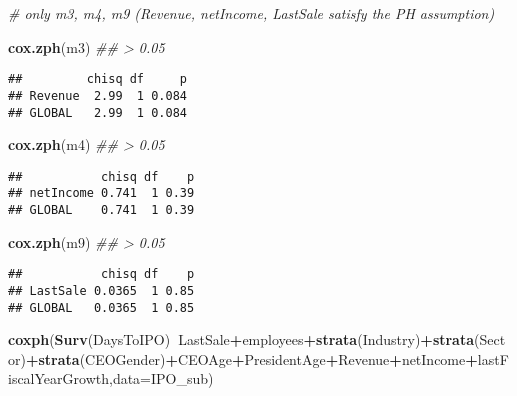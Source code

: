 \documentclass[]{article}
\newenvironment{Shaded}{\begin{snugshade}}{\end{snugshade}}
\newcommand{\CommentTok}[1]{\textcolor[rgb]{0.56,0.35,0.01}{\textit{#1}}}
\newcommand{\DataTypeTok}[1]{\textcolor[rgb]{0.13,0.29,0.53}{#1}}
\newcommand{\KeywordTok}[1]{\textcolor[rgb]{0.13,0.29,0.53}{\textbf{#1}}}
\newcommand{\NormalTok}[1]{#1}
\newcommand{\OperatorTok}[1]{\textcolor[rgb]{0.81,0.36,0.00}{\textbf{#1}}}
\begin{document}
\begin{Shaded}
\begin{Highlighting}[]
\CommentTok{# only m3, m4, m9 (Revenue, netIncome, LastSale satisfy the PH assumption)}

\KeywordTok{cox.zph}\NormalTok{(m3) }\CommentTok{## >  0.05}
\end{Highlighting}
\end{Shaded}

\begin{verbatim}
##         chisq df     p
## Revenue  2.99  1 0.084
## GLOBAL   2.99  1 0.084
\end{verbatim}

\begin{Shaded}
\begin{Highlighting}[]
\KeywordTok{cox.zph}\NormalTok{(m4) }\CommentTok{## >  0.05}
\end{Highlighting}
\end{Shaded}

\begin{verbatim}
##           chisq df    p
## netIncome 0.741  1 0.39
## GLOBAL    0.741  1 0.39
\end{verbatim}

\begin{Shaded}
\begin{Highlighting}[]
\KeywordTok{cox.zph}\NormalTok{(m9) }\CommentTok{## >  0.05}
\end{Highlighting}
\end{Shaded}

\begin{verbatim}
##           chisq df    p
## LastSale 0.0365  1 0.85
## GLOBAL   0.0365  1 0.85
\end{verbatim}

\begin{Shaded}
\begin{Highlighting}[]
\KeywordTok{coxph}\NormalTok{(}\KeywordTok{Surv}\NormalTok{(DaysToIPO)}\OperatorTok{~}\NormalTok{LastSale}\OperatorTok{+}\NormalTok{employees}\OperatorTok{+}\KeywordTok{strata}\NormalTok{(Industry)}\OperatorTok{+}\KeywordTok{strata}\NormalTok{(Sector)}\OperatorTok{+}\KeywordTok{strata}\NormalTok{(CEOGender)}\OperatorTok{+}\NormalTok{CEOAge}\OperatorTok{+}\NormalTok{PresidentAge}\OperatorTok{+}\NormalTok{Revenue}\OperatorTok{+}\NormalTok{netIncome}\OperatorTok{+}\NormalTok{lastFiscalYearGrowth,}\DataTypeTok{data=}\NormalTok{IPO_sub)}
\end{Highlighting}
\end{Shaded}
\end{document}
